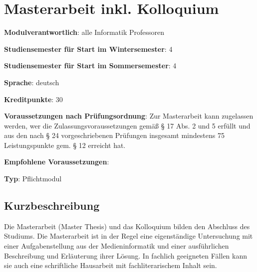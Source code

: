 \chapter{Masterarbeit inkl.
Kolloquium\label{/mi-2017/modulbeschreibungen-master/MA_All_Modul_Masterarbeit}}\label{masterarbeit-inkl.-kolloquiumpathlabelmi-2017modulbeschreibungen-mastermaux5fallux5fmodulux5fmasterarbeit}

\begin{modulHead}
\textbf{Modulverantwortlich}: alle Informatik
Professoren
\end{modulHead}
\begin{modulHead}
\textbf{Studiensemester
für Start im Wintersemester}:
4
\end{modulHead}
\begin{modulHead}
\textbf{Studiensemester für Start
im Sommersemester}:
4
\end{modulHead}
\begin{modulHead}
\textbf{Sprache}:
deutsch
\end{modulHead}
\begin{modulHead}
\textbf{Kreditpunkte}:
30
\end{modulHead}
\begin{modulHead}
\textbf{Voraussetzungen nach
Prüfungsordnung}: Zur Masterarbeit kann zugelassen werden, wer die
Zulassungsvoraussetzungen gemäß § 17 Abs. 2 und 5 erfüllt und aus den
nach § 24 vorgeschriebenen Prüfungen insgesamt mindestens 75
Leistungspunkte gem. § 12 erreicht
hat.
\end{modulHead}
\begin{modulHead}
\textbf{Empfohlene
Voraussetzungen}: ~
\end{modulHead}
\begin{modulHead}
\textbf{Typ}:
Pflichtmodul
\end{modulHead}


\section*{Kurzbeschreibung\label{/mi-2017/modulbeschreibungen-master/MA_All_Modul_Masterarbeit}}\label{kurzbeschreibungpathlabelmi-2017modulbeschreibungen-mastermaux5fallux5fmodulux5fmasterarbeit}

Die Masterarbeit (Master Thesis) und das Kolloquium bilden den Abschluss
des Studiums. Die Masterarbeit ist in der Regel eine eigenständige
Untersuchung mit einer Aufgabenstellung aus der Medieninformatik und
einer ausführlichen Beschreibung und Erläuterung ihrer Lösung. In
fachlich geeigneten Fällen kann sie auch eine schriftliche Hausarbeit
mit fachliterarischem Inhalt sein.

